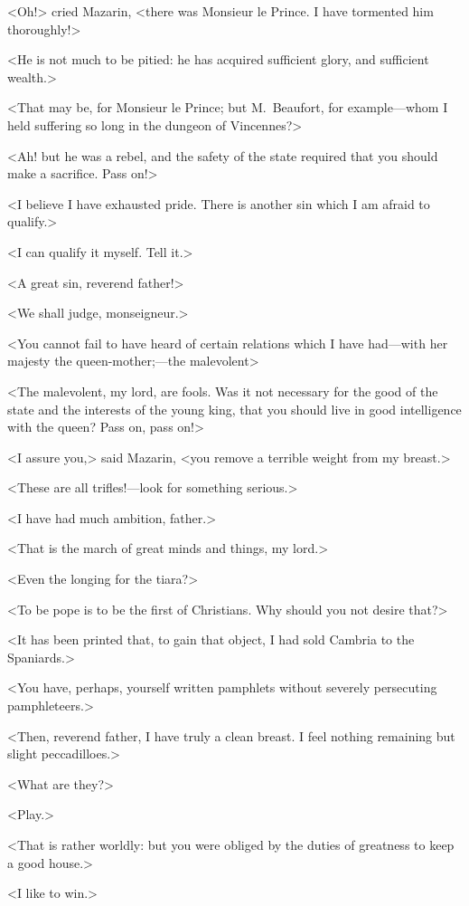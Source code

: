 <Oh!> cried Mazarin, <there was Monsieur le Prince. I have tormented him thoroughly!>

<He is not much to be pitied: he has acquired sufficient glory, and sufficient wealth.>

<That may be, for Monsieur le Prince; but M.~Beaufort, for example—whom I held suffering so long in the dungeon of Vincennes?>

<Ah! but he was a rebel, and the safety of the state required that you should make a sacrifice. Pass on!>

<I believe I have exhausted pride. There is another sin which I am afraid to qualify.>

<I can qualify it myself. Tell it.>

<A great sin, reverend father!>

<We shall judge, monseigneur.>

<You cannot fail to have heard of certain relations which I have had—with her majesty the queen-mother;—the malevolent\longdash>

<The malevolent, my lord, are fools. Was it not necessary for the good of the state and the interests of the young king, that you should live in good intelligence with the queen? Pass on, pass on!>

<I assure you,> said Mazarin, <you remove a terrible weight from my breast.>

<These are all trifles!—look for something serious.>

<I have had much ambition, father.>

<That is the march of great minds and things, my lord.>

<Even the longing for the tiara?>

<To be pope is to be the first of Christians. Why should you not desire that?>

<It has been printed that, to gain that object, I had sold Cambria to the Spaniards.>

<You have, perhaps, yourself written pamphlets without severely persecuting pamphleteers.>

<Then, reverend father, I have truly a clean breast. I feel nothing remaining but slight peccadilloes.>

<What are they?>

<Play.>

<That is rather worldly: but you were obliged by the duties of greatness to keep a good house.>

<I like to win.>

